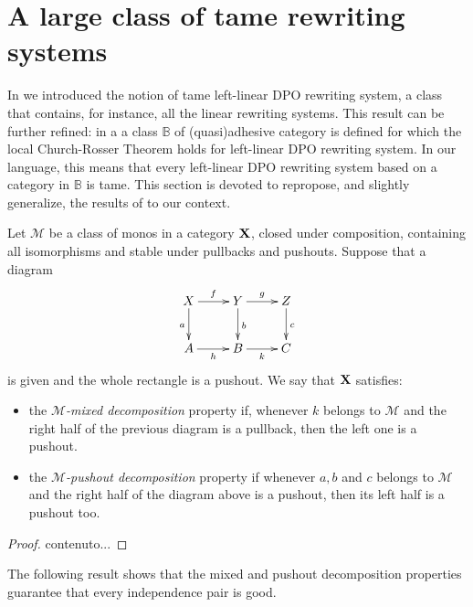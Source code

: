 \documentclass[a4paper,UKenglish,cleveref,pdftex, thm-restate,numberwithinsect]{lipics}
\def\X{\textbf {\textup{X}}}
\begin{document}
\section{A large class of tame rewriting systems}\label{app:fill}
 In  we introduced the notion of tame left-linear DPO rewriting system, a class that contains, for instance, all the linear rewriting systems. This result can be further refined: in a\cite{baldan2011adhesivity} a class  $\mathbb{B}$ of (quasi)adhesive category is defined for which the local Church-Rosser Theorem holds for left-linear DPO rewriting system. In our language, this means that every left-linear DPO rewriting system based on a category in $\mathbb{B}$ is tame. This section is devoted to repropose, and slightly generalize, the results of \cite{baldan2011adhesivity} to our context.

\begin{definition}Let $\mathcal{M}$ be a class of monos in a category $\X$, closed under composition, containing all isomorphisms and stable under pullbacks and pushouts. Suppose that a  diagram
	\[\xymatrix{X \ar[d]_{a} \ar[r]^{f}& \ar[r]^{g} Y \ar[d]^{b}& Z \ar[d]^{c}\\ A \ar[r]_{h}& B \ar[r]_{k}& C}\]
	is given and the whole rectangle is a pushout. We say that $\X$ satisfies:
	\begin{itemize}
		\item the \emph{$\mathcal{M}$-mixed decomposition} property if, whenever $k$ belongs to $\mathcal{M}$ and the right half of the previous diagram is a pullback, then the left one is a pushout.
		\item the \emph{$\mathcal{M}$-pushout decomposition} property if whenever $a, b$ and $c$ belongs to $\mathcal{M}$ and the right half of the diagram above is a pushout, then its left half is a pushout too.
	\end{itemize}
\end{definition}


\begin{lemma}\label{lem:closed}
\end{lemma}
\begin{proof}
	contenuto...
\end{proof}
The following result shows that the mixed and pushout decomposition properties guarantee that every independence pair is good.
\end{document}
